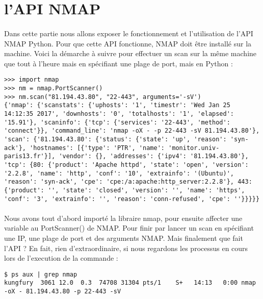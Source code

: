 \documentclass[12pt]{report}
\begin{document}
		\section{l'API NMAP}
			\paragraph{}
				Dans cette partie nous allons exposer le fonctionnement et l'utilisation de l'API NMAP Python. Pour que cette API fonctionne, NMAP doit être installé sur la machine. Voici la démarche à suivre pour effectuer un scan sur la même machine que tout à l'heure mais en spécifiant une plage de port, mais en Python :
				\begin{lstlisting}[caption=Scan NMAP avec Python, captionpos=b]
>>> import nmap
>>> nm = nmap.PortScanner()
>>> nm.scan("81.194.43.80", "22-443", arguments='-sV')
{'nmap': {'scanstats': {'uphosts': '1', 'timestr': 'Wed Jan 25 14:12:35 2017', 'downhosts': '0', 'totalhosts': '1', 'elapsed': '15.91'}, 'scaninfo': {'tcp': {'services': '22-443', 'method': 'connect'}}, 'command_line': 'nmap -oX - -p 22-443 -sV 81.194.43.80'}, 'scan': {'81.194.43.80': {'status': {'state': 'up', 'reason': 'syn-ack'}, 'hostnames': [{'type': 'PTR', 'name': 'monitor.univ-paris13.fr'}], 'vendor': {}, 'addresses': {'ipv4': '81.194.43.80'}, 'tcp': {80: {'product': 'Apache httpd', 'state': 'open', 'version': '2.2.8', 'name': 'http', 'conf': '10', 'extrainfo': '(Ubuntu)', 'reason': 'syn-ack', 'cpe': 'cpe:/a:apache:http_server:2.2.8'}, 443: {'product': '', 'state': 'closed', 'version': '', 'name': 'https', 'conf': '3', 'extrainfo': '', 'reason': 'conn-refused', 'cpe': ''}}}}}
				\end{lstlisting}
			\paragraph{}
				Nous avons tout d'abord importé la libraire nmap, pour ensuite affecter une variable au PortScanner() de NMAP. Pour finir par lancer un scan en spécifiant une IP, une plage de port et des arguments NMAP. Mais finalement que fait l'API ? En fait, rien d'extraordinaire, si nous regardons les processus en cours lors de l'execution de la commande :
				\begin{lstlisting}
$ ps aux | grep nmap
kungfury  3061 12.0  0.3  74708 31304 pts/1    S+   14:13   0:00 nmap -oX - 81.194.43.80 -p 22-443 -sV
				\end{lstlisting}
\end{document}
